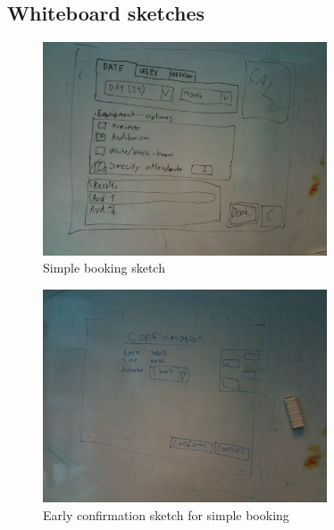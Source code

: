 \clearpage
\pagebreak

\subsection{Whiteboard sketches}

\begin{figure}[htb]
\begin{center}
\leavevmode
\includegraphics[width=0.75\textwidth]{images/whiteboard1}
\end{center}
\caption{Simple booking sketch}
\label{fig:app_w1}
\end{figure}

\begin{figure}[htb]
\begin{center}
\leavevmode
\includegraphics[width=0.75\textwidth]{images/whiteboard2}
\end{center}
\caption{Early confirmation sketch for simple booking}
\label{fig:app_w2}
\end{figure}

